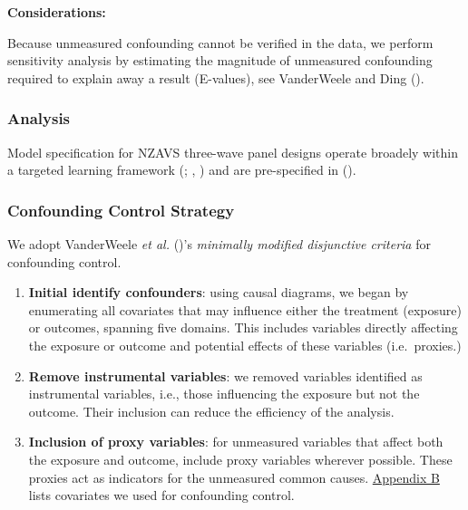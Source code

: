 \documentclass[
  singlecolumn]{article}
\begin{document}
\textbf{Considerations:}

Because unmeasured confounding cannot be verified in the data, we
perform sensitivity analysis by estimating the magnitude of unmeasured
confounding required to explain away a result (E-values), see
VanderWeele and Ding ().

\subsubsection{Analysis}\label{analysis}

Model specification for NZAVS three-wave panel designs operate broadely
within a targeted learning framework (; , ) and are pre-specified in
().

\subsubsection{Confounding Control
Strategy}\label{confounding-control-strategy}

We adopt VanderWeele \emph{et al.}
()'s \emph{minimally modified
disjunctive criteria} for confounding control.

\begin{enumerate}
\def\labelenumi{\arabic{enumi}.}
\item
  \textbf{Initial identify confounders}: using causal diagrams, we began
  by enumerating all covariates that may influence either the treatment
  (exposure) or outcomes, spanning five domains. This includes variables
  directly affecting the exposure or outcome and potential effects of
  these variables (i.e.~proxies.)
\item
  \textbf{Remove instrumental variables}: we removed variables
  identified as instrumental variables, i.e., those influencing the
  exposure but not the outcome. Their inclusion can reduce the
  efficiency of the analysis.
\item
  \textbf{Inclusion of proxy variables}: for unmeasured variables that
  affect both the exposure and outcome, include proxy variables wherever
  possible. These proxies act as indicators for the unmeasured common
  causes. \hyperref[appendix-demographics]{Appendix B} lists covariates
  we used for confounding control.
\end{enumerate}
\end{document}
